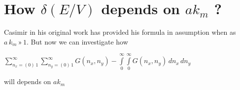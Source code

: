 \documentclass[11pt]{article}
\begin{document}
    \section{\texorpdfstring{How \(\delta\left(E/V\right)\) depends on
\(a k_m\)
?}{How \textbackslash{}delta\textbackslash{}left(E/V\textbackslash{}right) depends on a k\_m ?}}\label{how-deltaleftevright-depends-on-a-k_m}

    Casimir in his original work has provided his formula in assumption when
as \(a\,k_m\,»\,1\). But now we can investigate how

\(\sum\limits_{n_x=\left(0\right)\,1}^{\infty} \sum\limits_{n_y=\left(0\right)\,1}^{\infty} G\left(n_x, n_y\right) - \int\limits_{0}^{\infty} \int\limits_{0}^{\infty} G\left(n_x, n_y\right)\,d{n_x}\,d{n_y}\)

will depends on \(a k_m\)
\end{document}
